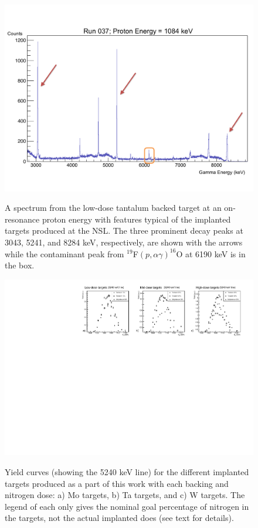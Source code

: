 \begin{figure}
\includegraphics[width=\linewidth]{figures/typicalSpectrum.pdf}
\label{fig: implantedSpectrum}
\caption{A spectrum from the low-dose tantalum backed target at an on-resonance proton energy with features typical of the implanted targets produced at the NSL. The three prominent decay peaks at 3043, 5241, and 8284 keV, respectively, are shown with the arrows while the contaminant peak from $^{19}$F$\left( p, \alpha\gamma \right)^{16}$O at 6190 keV is in the box.  }
\end{figure}


\begin{figure}
\includegraphics[width=\linewidth]{figures/comparePercentageBW.pdf}
\label{fig: yieldCurves}
\caption{Yield curves (showing the 5240 keV line) for the different implanted targets produced as a part of this work with each backing and nitrogen dose: a) Mo targets, b) Ta targets, and c) W targets. The legend of each only gives the nominal goal percentage of nitrogen in the targets, not the actual implanted does (see text for details).}
\end{figure}


